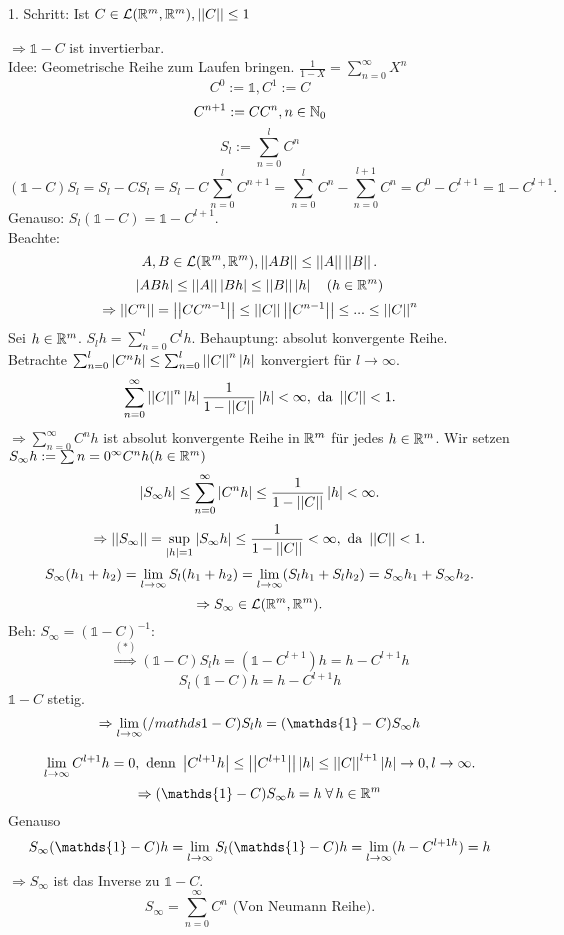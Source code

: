 \documentclass[../ana2.tex]{subfiles}
\begin{document}
\begin{bew}
    1. Schritt: Ist \(C \in \mathcal{L}(\mathbb{R}^m, \mathbb{R}^m), \left|\left|C\right|\right| \leq 1\)

    \( \Rightarrow \mathds{1} - C \) ist invertierbar.\\
    Idee: Geometrische Reihe zum Laufen bringen. \( \frac{1}{1-X} = \sum_{n=0}^\infty X^n \)
    \[ C^0 := \mathds{1}, C^1 := C\]
    \[ C^{n+1} := C C^n, n \in \mathbb{N}_0 \]
    \[ S_l := \sum_{n=0}^l C^n \]
    \[ (\mathds{1} - C)S_l = S_l - C S_l 
    = S_l - C \sum_{n=0}^l C^{n+1} 
    = \sum_{n=0}^l C^{n} - \sum_{n=0}^{l+1} C^n
    = C^0 - C^{l+1} = \mathds{1} - C^{l+1}. \tag{\(*\)}\]
    Genauso: \( S_l(\mathds{1} - C) = \mathds{1} - C^{l+1} \).\\
    Beachte: \[A, B \in \mathcal{L}(\mathbb{R}^m, \mathbb{R}^m), 
    \left|\left|A B\right|\right| \leq \left|\left|A\right|\right| \left|\left|B\right|\right|. \]
    \[\left|ABh\right| \leq \left|\left|A\right|\right| \left|Bh\right| \leq \left|\left|B\right|\right| \left|h\right| \quad (h \in \mathbb{R}^m) \]
    \[\Rightarrow \left|\left|C^n\right|\right| = \left|\left|C C^{n-1}\right|\right| \leq \left|\left|C\right|\right| \left|\left|C^{n-1}\right|\right|
    \leq ... \leq \left|\left|C\right|\right|^n\]
    Sei \(h \in \mathbb{R}^m\). \( S_l h = \sum_{n=0}^l C^l h \).
    Behauptung: absolut konvergente Reihe.\\
    Betrachte \( \sum_{n=0}^l \left| C^n h \right| 
    \leq \sum_{n=0}^l \left|\left|C\right|\right|^n \left|h\right| \) konvergiert für \( l \rightarrow \infty \).
    \[ \sum_{n=0}^\infty \left|\left|C\right|\right|^n \left|h\right| \frac{1}{1 - \left|\left|C\right|\right|} \left|h\right| < \infty, 
    \text{ da } \left|\left|C\right|\right| < 1. \]
    \( \Rightarrow \sum_{n=0}^\infty C^n h \) ist absolut konvergente Reihe in
    \( \mathbb{R}^m \) für jedes \( h \in \mathbb{R}^m \).
    Wir setzen \( S_\infty h := \sum{n=0}^\infty C^n h (h \in \mathbb{R}^m)\)
    \[ \left| S_\infty h \right| \leq \sum_{n=0}^\infty \left| C^n h \right| 
    \leq \frac{1}{1 - \left|\left|C\right|\right|}\left|h\right| < \infty. \]
    \[ \Rightarrow \left|\left|S_\infty\right|\right| = \underset{\left|h\right| = 1}{\sup} 
    \left| S_\infty h \right| \leq \frac{1}{1 - \left|\left|C\right|\right|} < \infty, 
    \text{ da } \left|\left|C\right|\right| < 1. \]
    \[ S_\infty(h_1 + h_2) 
    = \lim\limits_{l\rightarrow\infty} S_l(h_1 + h_2) 
    = \lim\limits_{l\rightarrow\infty} (S_l h_1 + S_l h_2)
    = S_\infty h_1 + S_\infty h_2. \]
    \[ \Rightarrow S_\infty \in \mathcal{L}(\mathbb{R}^m, \mathbb{R}^m). \]
    Beh: \( S_\infty = (\mathds{1} -C)^{-1} \): 
    \[ \overset{(*)}{\Rightarrow}  ( \mathds{1} - C)S_l h = (\mathds{1} - C^{l+1})h 
    = h - C^{l+1}h \]
    \[ S_l (\mathds{1} - C) h = h - C^{l+1}h \]
    \( \mathds{1} - C \) stetig.
    \[\Rightarrow \limes{l} (/mathds{1}-C) S_lh = (\mathds{1}-C) S_\infty h\]

    \[ \lim\limits_{l\rightarrow\infty} C^{l+1} h = 0, \text{ denn } \left|C^{l+1}h\right| \leq \left|\left|C^{l+1}\right|\right| 
    \left|h\right| \leq \left|\left|C\right|\right|^{l+1} \left|h\right| \rightarrow 0, l \rightarrow \infty. \]
    \[ \Rightarrow (\mathds{1} - C) S_\infty h = h \;\forall h \in \R^m \]
    Genauso \[S_\infty(\mathds{1}-C)h = \limes{l} S_l(\mathds{1}-C)h 
    = \limes{l}(h-C^{l+1 h}) = h\]
    \( \Rightarrow S_\infty \) ist das Inverse zu \( \mathds{1} - C \). 
    \[ S_\infty = \sum_{n=0}^\infty C^n \text{ (Von Neumann Reihe)}. \]
    

\end{bew}
\end{document}
